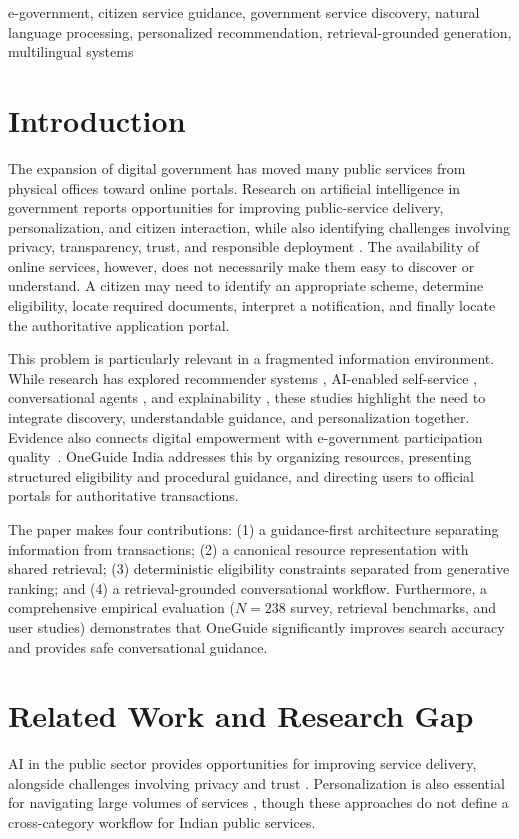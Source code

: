 \documentclass[conference]{IEEEtran}
\begin{document}
\begin{IEEEkeywords}
e-government, citizen service guidance, government service discovery, natural language processing, personalized recommendation, retrieval-grounded generation, multilingual systems
\end{IEEEkeywords}

\section{Introduction}
The expansion of digital government has moved many public services from physical offices toward online portals. Research on artificial intelligence in government reports opportunities for improving public-service delivery, personalization, and citizen interaction, while also identifying challenges involving privacy, transparency, trust, and responsible deployment \cite{souza2019,albesher2022,alhosani2024}. The availability of online services, however, does not necessarily make them easy to discover or understand. A citizen may need to identify an appropriate scheme, determine eligibility, locate required documents, interpret a notification, and finally locate the authoritative application portal.

This problem is particularly relevant in a fragmented information environment. While research has explored recommender systems \cite{lin2022}, AI-enabled self-service \cite{chen2021}, conversational agents \cite{cantador2021,cortes2023}, and explainability \cite{fahr2025}, these studies highlight the need to integrate discovery, understandable guidance, and personalization together. Evidence also connects digital empowerment with e-government participation quality~\cite{sharma2024}. OneGuide India addresses this by organizing resources, presenting structured eligibility and procedural guidance, and directing users to official portals for authoritative transactions.

The paper makes four contributions: (1) a guidance-first architecture separating information from transactions; (2) a canonical resource representation with shared retrieval; (3) deterministic eligibility constraints separated from generative ranking; and (4) a retrieval-grounded conversational workflow. Furthermore, a comprehensive empirical evaluation ($N=238$ survey, retrieval benchmarks, and user studies) demonstrates that OneGuide significantly improves search accuracy and provides safe conversational guidance.

\section{Related Work and Research Gap}
AI in the public sector provides opportunities for improving service delivery, alongside challenges involving privacy and trust \cite{souza2019,albesher2022,alhosani2024}. Personalization is also essential for navigating large volumes of services \cite{lin2022,chen2021}, though these approaches do not define a cross-category workflow for Indian public services.
\end{document}
